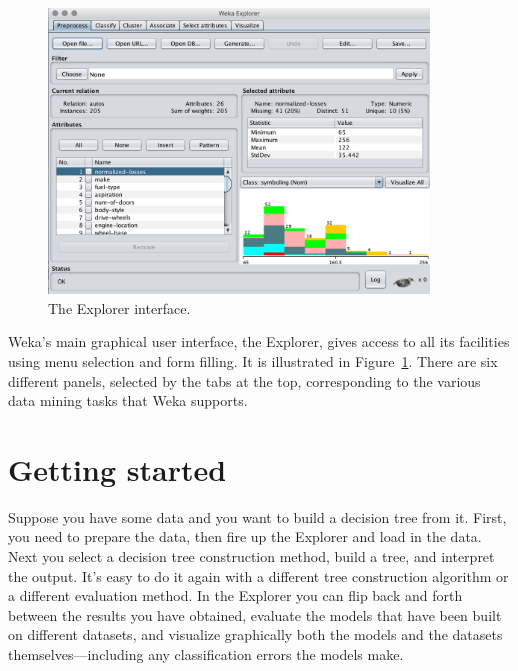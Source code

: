 \begin{figure}[!th]
\centering
\includegraphics[width=0.9\textwidth]{images/B2_1.png}
\caption{The Explorer interface.}
\label{fig:explorer}
\end{figure}

Weka's main graphical user interface, the Explorer, gives access to
all its facilities using menu selection and form filling. It is
illustrated in Figure~\ref{fig:explorer}. There are six different
panels, selected by the tabs at the top, corresponding to the various
data mining tasks that Weka supports.

\section{Getting started}
\label{sect:getting_started}

Suppose you have some data and you want to build a decision tree from
it. First, you need to prepare the data, then fire up the Explorer and
load in the data. Next you select a decision tree construction method,
build a tree, and interpret the output. It’s easy to do it again with
a different tree construction algorithm or a different evaluation
method. In the Explorer you can flip back and forth between the
results you have obtained, evaluate the models that have been built on
different datasets, and visualize graphically both the models and the
datasets themselves—including any classification errors the models
make.

